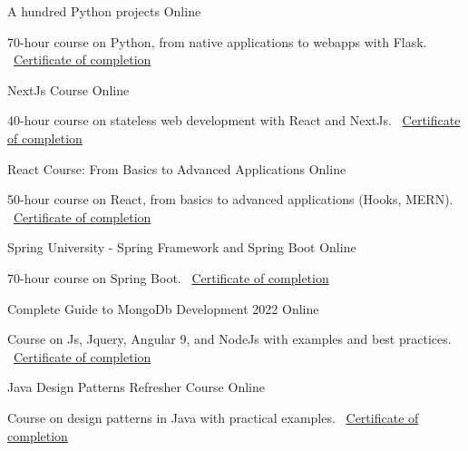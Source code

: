 \documentclass[]{awesome-cv}
\begin{document}
\begin{cventries}
    \cventry
    {}
    {A hundred Python projects}
    {Online}
    {}
    {\begin{cvitems}
        \item {70-hour course on Python, from native applications to webapps with Flask.
        \newline \faLink\ \href{https://www.udemy.com/certificate/UC-2d01021e-af92-434c-a4a3-7fc7b33976c9/}{Certificate of completion}}
    \end{cvitems}}

    \cventry
    {}
    {NextJs Course}
    {Online}
    {}
    {\begin{cvitems}
        \item {40-hour course on stateless web development with React and NextJs.
        \newline \faLink\ \href{https://www.udemy.com/certificate/UC-1ede8757-aa0d-406f-813a-8eaa400532c5/}{Certificate of completion}}
    \end{cvitems}}

    \cventry
    {}
    {React Course: From Basics to Advanced Applications}
    {Online}
    {}
    {\begin{cvitems}
        \item {50-hour course on React, from basics to advanced applications (Hooks, MERN).
        \newline \faLink\ \href{https://www.udemy.com/certificate/UC-fcb467ab-c089-419c-9b6a-afe97f894d14/}{Certificate of completion}}
    \end{cvitems}}

    \cventry
    {}
    {Spring University - Spring Framework and Spring Boot}
    {Online}
    {}
    {\begin{cvitems}
        \item {70-hour course on Spring Boot.
        \newline \faLink\ \href{https://www.udemy.com/certificate/UC-ee0ce349-6915-479b-b038-5253aba9d0d8/}{Certificate of completion}}
    \end{cvitems}}

    \cventry
    {}
    {Complete Guide to MongoDb Development 2022}
    {Online}
    {}
    {\begin{cvitems}
        \item {Course on Js, Jquery, Angular 9, and NodeJs with examples and best practices.
        \newline \faLink\ \href{https://www.udemy.com/certificate/UC-b990e98a-9b76-44b1-8e3e-43b68213725c/}{Certificate of completion}}
    \end{cvitems}}

    \cventry
    {}
    {Java Design Patterns Refresher Course}
    {Online}
    {}
    {\begin{cvitems}
        \item {Course on design patterns in Java with practical examples.
        \newline \faLink\ \href{https://www.udemy.com/certificate/UC-982e3338-ea7d-4434-bf27-af8e38b77bd5/}{Certificate of completion}}
    \end{cvitems}}
\end{cventries}
\end{document}
